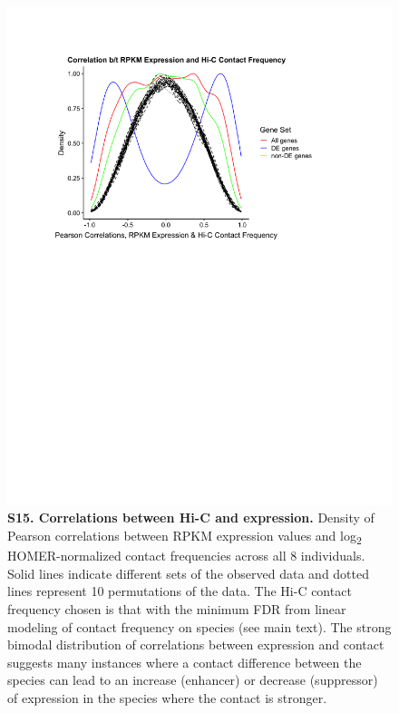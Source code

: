 \begin{figure}[!htb]
\centering
\includegraphics[width=6in]{img/figS15.pdf}
\caption[Correlations between Hi-C and expression.]{\textbf{S15. Correlations between Hi-C and expression.} Density of Pearson correlations between RPKM expression values and log\textsubscript{2} HOMER-normalized contact frequencies across all 8 individuals. Solid lines indicate different sets of the observed data and dotted lines represent 10 permutations of the data. The Hi-C contact frequency chosen is that with the minimum FDR from linear modeling of contact frequency on species (see main text). The strong bimodal distribution of correlations between expression and contact suggests many instances where a contact difference between the species can lead to an increase (enhancer) or decrease (suppressor) of expression in the species where the contact is stronger.}
\label{fig:figS15}
\end{figure}

